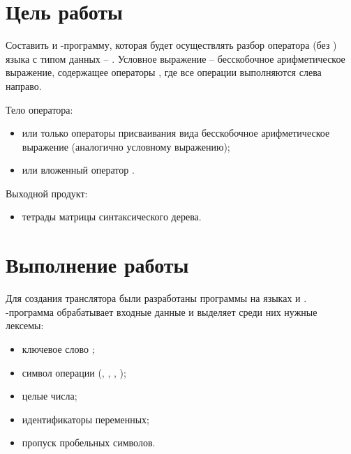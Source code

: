 





\tableofcontents
\newpage

\section{Цель работы}

Составить  и -программу, которая будет осуществлять разбор оператора  (без ) языка  с типом данных -- . Условное выражение -- бесскобочное арифметическое выражение, содержащее операторы \code{+ - * /}, где все операции выполняются слева направо. 

\noindent Тело оператора:

\begin{itemize}
	\item или только операторы присваивания вида  бесскобочное арифметическое выражение (аналогично условному выражению);
	\item или вложенный оператор .
\end{itemize}

\noindent Выходной продукт:

\begin{itemize}
	\item тетрады матрицы синтаксического дерева.
\end{itemize}

\section{Выполнение работы}

Для создания транслятора были разработаны программы на языках  и . -программа обрабатывает входные данные и выделяет среди них нужные лексемы:

\begin{itemize}
	\item ключевое слово ;
	\item символ операции (\code{+}, \code{-}, \code{*}, \code{/});
	\item целые числа;
	\item идентификаторы переменных;
	\item пропуск пробельных символов.
\end{itemize}


